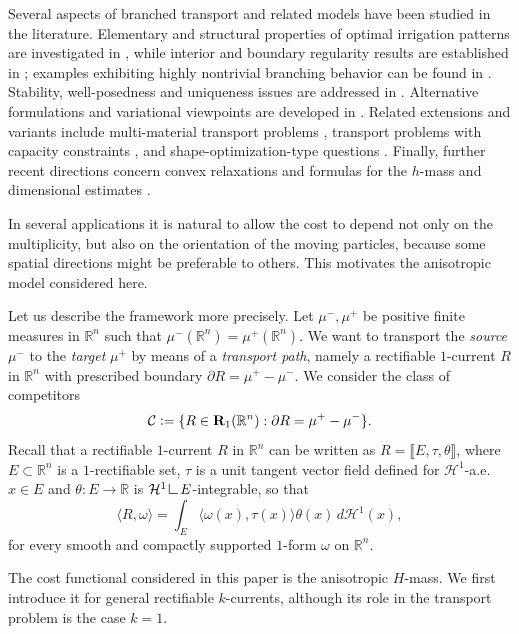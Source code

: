 \documentclass{article}
\numberwithin{equation}{section}
\theoremstyle{plain}%
\theoremstyle{definition}
\theoremstyle{definition}
\newcommand{\rgrande}{\mathbb{R}}
\newcommand{\haus}{\mathcal{H}}
\newcommand{\correttvar}[2]{\mathbf{R}_{#1}(\rgrande^{#2})}
\newcommand{\mrestr}{\mathop{\hbox{\vrule height 7pt width 0.5pt depth 0pt
\vrule height 0.5pt width 6pt depth 0pt}}\nolimits}
\newcommand{\prodscal}[2]{\langle{#1} , {#2} \rangle}
\begin{document}
Several aspects of branched transport and related models have been studied in the literature. Elementary and structural properties of optimal irrigation patterns are investigated in \cite{DevSol07, bcm08}, while interior and boundary regularity results are established in \cite{xia04, xia11, ms10, bs14}; examples exhibiting highly nontrivial branching behavior can be found in \cite{AnMa2, Goldman2017SelfsimilarMO}. Stability, well-posedness and uniqueness issues are addressed in \cite{bf08, cdrm18, cdmCPAM, CaldMS23}. Alternative formulations and variational viewpoints are developed in \cite{bbs06, bbs11, bw16}. Related extensions and variants include multi-material transport problems \cite{mmt19, mmst21}, transport problems with capacity constraints \cite{XiaSun25}, and shape-optimization-type questions \cite{PegSantXia19, bs18}. Finally, further recent directions concern convex relaxations and formulas for the $h$-mass \cite{LoScWirth25} and dimensional estimates \cite{DePGolRuf23, CosGolKos24}.


In several applications it is natural to allow the cost to depend not only on the multiplicity, but also on the orientation of the moving particles, because some spatial directions might be preferable to others. This motivates the anisotropic model considered here.

Let us describe the framework more precisely. Let $\mu^-, \mu^+$ be positive finite measures in $\rgrande^n$ such that
$\mu^- (\rgrande^n) = \mu^+ (\rgrande^n).$
We want to transport the \textit{source} $\mu^-$ to the \textit{target} $\mu^+$ by means of a \textit{transport path}, namely a rectifiable $1$-current $R$ in $\rgrande^n$ with prescribed boundary
$
\partial R = \mu^+ - \mu^-.
$
We consider the class of competitors
$$
\mathcal{C} \vcentcolon = \{ R \in \correttvar{1}{n} : \partial R = \mu^+ - \mu^- \}
\text{.}
$$
Recall that a rectifiable $1$-current $R$ in $\rgrande^n$ can be written as $R=\llbracket E,\tau,\theta \rrbracket$, where $E\subset \rgrande^n$ is a $1$-rectifiable set, $\tau$ is a unit tangent vector field defined for $\haus^1$-a.e. $x\in E$ and $\theta:E\to \rgrande$ is $\haus^1 \mrestr E$-integrable, so that
$$
\prodscal{R}{\omega} = \int_{E} {\prodscal{\omega(x)}{\tau(x)} \theta(x)} \,d \haus^1(x),
$$
for every smooth and compactly supported $1$-form $\omega$ on $\rgrande^n$.

The cost functional considered in this paper is the anisotropic $H$-mass. We first introduce it for general rectifiable $k$-currents, although its role in the transport problem is the case $k=1$.
\end{document}
